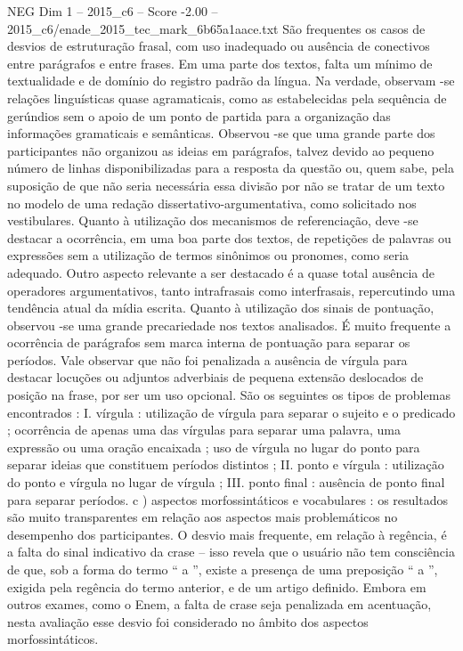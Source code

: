 \begin{textsample}{NEG Dim 1 – 2015\_c6 – Score -2.00 – 2015\_c6/enade\_2015\_tec\_mark\_6b65a1aace.txt}
São frequentes os casos de desvios de estruturação frasal, com uso inadequado ou ausência de conectivos entre parágrafos e entre frases.
Em uma parte dos textos, falta um mínimo de textualidade e de domínio do registro padrão da língua.
Na verdade, observam -se relações linguísticas quase agramaticais, como as estabelecidas pela sequência de gerúndios sem o apoio de um ponto de partida para a organização das informações gramaticais e semânticas.
Observou -se que uma grande parte dos participantes não organizou as ideias em parágrafos, talvez devido ao pequeno número de linhas disponibilizadas para a resposta da questão ou, quem sabe, pela suposição de que não seria necessária essa divisão por não se tratar de um texto no modelo de uma redação dissertativo-argumentativa, como solicitado nos vestibulares.
Quanto à utilização dos mecanismos de referenciação, deve -se destacar a ocorrência, em uma boa parte dos textos, de repetições de palavras ou expressões sem a utilização de termos sinônimos ou pronomes, como seria adequado.
Outro aspecto relevante a ser destacado é a quase total ausência de operadores argumentativos, tanto intrafrasais como interfrasais, repercutindo uma tendência atual da mídia escrita.
Quanto à utilização dos sinais de pontuação, observou -se uma grande precariedade nos textos analisados.
É muito frequente a ocorrência de parágrafos sem marca interna de pontuação para separar os períodos.
Vale observar que não foi penalizada a ausência de vírgula para destacar locuções ou adjuntos adverbiais de pequena extensão deslocados de posição na frase, por ser um uso opcional.
São os seguintes os tipos de problemas encontrados : I. vírgula : utilização de vírgula para separar o sujeito e o predicado ; ocorrência de apenas uma das vírgulas para separar uma palavra, uma expressão ou uma oração encaixada ; uso de vírgula no lugar do ponto para separar ideias que constituem períodos distintos ; II. ponto e vírgula : utilização do ponto e vírgula no lugar de vírgula ; III. ponto final : ausência de ponto final para separar períodos. c ) aspectos morfossintáticos e vocabulares : os resultados são muito transparentes em relação aos aspectos mais problemáticos no desempenho dos participantes.
O desvio mais frequente, em relação à regência, é a falta do sinal indicativo da crase – isso revela que o usuário não tem consciência de que, sob a forma do termo “ a ”, existe a presença de uma preposição “ a ”, exigida pela regência do termo anterior, e de um artigo definido.
Embora em outros exames, como o Enem, a falta de crase seja penalizada em acentuação, nesta avaliação esse desvio foi considerado no âmbito dos aspectos morfossintáticos.

\end{textsample}

